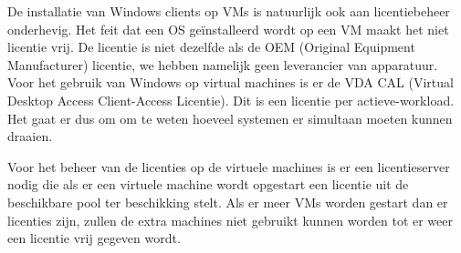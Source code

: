 De installatie van Windows clients op VMs is natuurlijk ook aan licentiebeheer onderhevig. Het feit dat een OS ge\"installeerd wordt op een VM maakt het niet licentie vrij. De licentie is niet dezelfde als de OEM (Original Equipment Manufacturer) licentie, we hebben namelijk geen leverancier van apparatuur. Voor het gebruik van Windows op virtual machines is er de VDA CAL (Virtual Desktop Access Client-Access Licentie). Dit is een licentie per actieve-workload. Het gaat er dus om om te weten hoeveel systemen er simultaan moeten kunnen draaien.

Voor het beheer van de licenties op de virtuele machines is er een licentieserver nodig die als er een virtuele machine wordt opgestart een licentie uit de beschikbare pool ter beschikking stelt. Als er meer VMs worden gestart dan er licenties zijn, zullen de extra machines niet gebruikt kunnen worden tot er weer een licentie vrij gegeven wordt.
